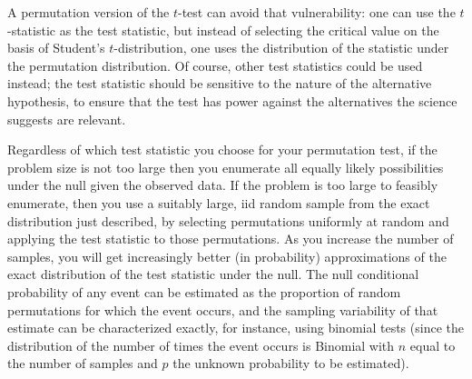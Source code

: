 \begin{example}[label=exa:cont]
A permutation version of the $t$-test can avoid that vulnerability: one can
use the $t$-statistic as the test statistic, but instead of selecting the critical
value on the basis of Student's $t$-distribution, one uses the
distribution of the statistic under the permutation distribution.
Of course, other test statistics could be used instead; the test statistic
should be sensitive to the nature of the alternative hypothesis, to ensure
that the test has power against the alternatives the science suggests are
relevant.

Regardless of which test statistic you choose for your permutation test, if the
problem size is not too large then you enumerate all equally likely
possibilities under the null given the observed data.  If the problem is too
large to feasibly enumerate, then you use a suitably large, iid random 
sample from the exact distribution just described, by selecting permutations
uniformly at random and applying the test statistic to those permutations.  As you increase the number
of samples, you will get increasingly better (in probability) approximations of the exact
distribution of the test statistic under the null.  The null conditional probability of any
event can be estimated as the proportion of random permutations for which the event occurs,
and the sampling variability of that estimate can be characterized exactly, for instance,
using binomial tests (since the distribution of the number of times the event occurs
is Binomial with $n$ equal to the number of samples and $p$ the unknown probability to be
estimated). 
\end{example}

